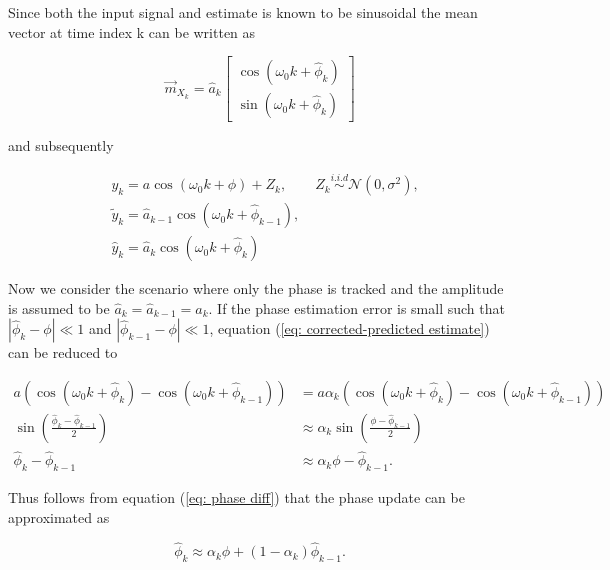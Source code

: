 \documentclass[11pt,a4paper,twoside]{report}
\newcommand{\messF}[3]{\overrightarrow{#1}_{{#2}_{k{#3}}}}
\begin{document}
Since both the input signal and estimate is known to be sinusoidal the mean vector at time index k can be written as \cite{ST:Malmberg}

\begin{equation*}
	\messF{m}{X}{} = \hat{a}_k
		\begin{bmatrix}
			\cos{\left(\omega_0k + \hat{\phi}_k\right)} \\
			\sin{\left(\omega_0k + \hat{\phi}_k\right)}
		\end{bmatrix}
\end{equation*}

and subsequently

\begin{align}
	& y_k = a\cos{\left(\omega_0k + \phi\right)} + Z_k, \qquad Z_k \overset{i.i.d}{\sim} \mathcal{N}\left(0, \sigma^2\right), \\
	& \tilde{y}_k = \hat{a}_{k-1}\cos{\left(\omega_0k + \hat{\phi}_{k-1}\right)}, \\
	& \hat{y}_k = \hat{a}_k\cos{\left(\omega_0k + \hat{\phi}_k\right)}
\end{align}


Now we consider the scenario where only the phase is tracked and the amplitude is assumed to be $\hat{a}_k = \hat{a}_{k-1} = a_k$. If the phase estimation error is small such that $\left|\hat{\phi}_k - \phi\right|\ll1$ and $\left|\hat{\phi}_{k-1} - \phi\right|\ll1$, equation (\ref{eq: corrected-predicted estimate}) can be reduced to

\begin{align}
	a\left(\cos{\left(\omega_0k + \hat{\phi}_k\right)}- \cos{\left(\omega_0k + \hat{\phi}_{k-1}\right)}\right) &= 
	a\alpha_k\left(\cos{\left(\omega_0k + \hat{\phi}_k\right)}- \cos{\left(\omega_0k + \hat{\phi}_{k-1}\right)}\right) \\
	\sin{\left(\frac{\hat{\phi}_k - \hat{\phi}_{k-1}}{2}\right)} &\approx \alpha_k\sin{\left(\frac{\phi - \hat{\phi}_{k-1}}{2}\right)} \\
	\label{eq: phase diff}
	\hat{\phi}_k - \hat{\phi}_{k-1} &\approx \alpha_k\phi - \hat{\phi}_{k-1}.
\end{align}

Thus follows from equation (\ref{eq: phase diff}) that the phase update can be approximated as

\begin{equation}
	\hat{\phi}_k \approx \alpha_k\phi + \left(1-\alpha_k\right)\hat{\phi}_{k-1}.
\end{equation}
\end{document}
